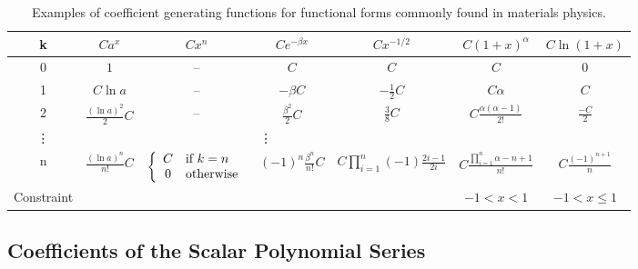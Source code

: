 \begin{sidewaystable}[htp]
\caption{Examples of coefficient generating functions for functional forms commonly found in materials physics.}
\begin{center}
\begin{tabular}{c | c c c c c c}
	k	& %
		$C a^x$	& %
			$C x^n$	& %
				$Ce^{-\beta x}$	& %
					$C x^{-1/2}$ & %
                        $C (1 + x)^\alpha$ & %
                            $C \ln(1 + x)$ \\[2ex]
	\hline
	0	& %
		$1$	& %
			--	& %
				$C$	& %
					$C$ & %
                        $C$ & %
                            $0$ \\[2ex]
	1	& %
		$C \ln a$	& %
			--	& %
				$-\beta C$		& %
					$-\frac{1}{2}C$ & %
                        $C\alpha$ & %
                            $C$ \\[2ex]
	2	& %
		$\frac{(\ln a)^2}{2} C$	& %
			--	&  %
				$\frac{\beta^2}{2} C$	& %
					$\frac{3}{8}C$	& %
                        $C\frac{\alpha (\alpha - 1)}{2!}$ & %
                            $\frac{-C}{2}$ \\[2ex]
	\vdots & \multicolumn{4}{c}{\vdots} \\[2ex]
	n	& %
		$\frac{(\ln a)^n}{n!} C$	& %
			$\left\{\begin{array}{c l}
				C & \text{if}\ k = n \\
				0 & \text{otherwise}
			  \end{array}\right.$	& %
				$(-1)^n\frac{\beta^n}{n!} C$	& %
					$C \prod_{i=1}^n (-1)\frac{2i - 1}{2i}$ & %
                        $C \frac{\prod_{i=1}^n \alpha - n + 1}{n!}$ & %
                            $C\frac{(-1)^{n+1}}{n}$ \\[2ex]
	\hline
    Constraint & %
        & %
            & %
                & %
                    & %
                        $-1 < x < 1$ & %
                            $-1 < x \le 1$ \\
    \hline
\end{tabular}
\end{center}
\label{tab:generating functions of common functions}
\end{sidewaystable}

\subsection{Coefficients of the Scalar Polynomial Series}
\label{sec:worked scalar coeffs}

